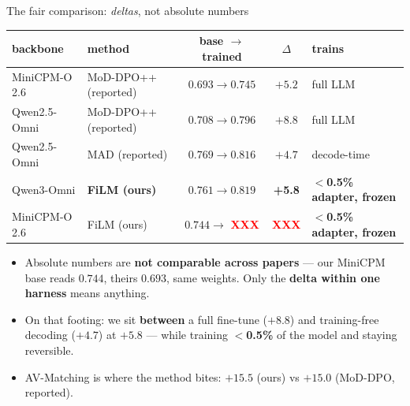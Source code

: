 \documentclass[aspectratio=169,11pt]{beamer}
\newcommand{\XXX}{\textcolor{red}{\textbf{XXX}}}
\begin{document}
\begin{frame}{The fair comparison: \emph{deltas}, not absolute numbers}
\centering
\renewcommand{\arraystretch}{1.25}
\small
\begin{tabular}{l l c c l}
\toprule
backbone & method & base $\to$ trained & $\Delta$ & trains \\
\midrule
MiniCPM-O 2.6 & MoD-DPO++ {\scriptsize(reported)} & $0.693 \to 0.745$ & $+5.2$ & \textcolor{red!70!black}{full LLM} \\ %
Qwen2.5-Omni  & MoD-DPO++ {\scriptsize(reported)} & $0.708 \to 0.796$ & $+8.8$ & \textcolor{red!70!black}{full LLM} \\ %
Qwen2.5-Omni  & MAD {\scriptsize(reported)}       & $0.769 \to 0.816$ & $+4.7$ & \textcolor{frz}{decode-time} \\ %
\midrule
Qwen3-Omni    & \textbf{FiLM (ours)}   & $0.761 \to 0.819$ & \textbf{+5.8} & \textcolor{trn}{\textbf{$<$0.5\% adapter, frozen}} \\ %
MiniCPM-O 2.6 & FiLM (ours)            & $0.744 \to$ \XXX  & \XXX & \textcolor{trn}{\textbf{$<$0.5\% adapter, frozen}} \\
\bottomrule
\end{tabular}
\vfill
\begin{itemize}\small
\item Absolute numbers are \textbf{not comparable across papers} --- our MiniCPM base reads $0.744$,
theirs $0.693$, same weights. Only the \textbf{delta within one harness} means anything.
\item On that footing: we sit \textbf{between} a full fine-tune ($+8.8$) and training-free decoding
($+4.7$) at $+5.8$ --- while training \textbf{$<$0.5\%} of the model and staying reversible.
\item AV-Matching is where the method bites: \textbf{$+15.5$} (ours) vs $+15.0$ (MoD-DPO, reported).
\end{itemize}
\end{frame}
\end{document}
